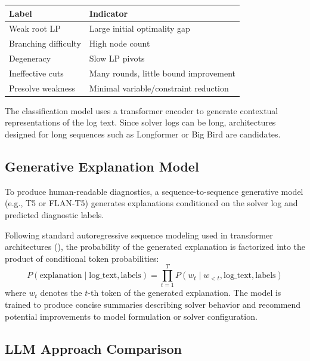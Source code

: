 \documentclass[11pt]{article}
\begin{document}
\begin{table}[h]
\centering
\begin{tabular}{ll}
\toprule
\textbf{Label} & \textbf{Indicator} \\
\midrule
Weak root LP & Large initial optimality gap \\
Branching difficulty & High node count \\
Degeneracy & Slow LP pivots \\
Ineffective cuts & Many rounds, little bound improvement \\
Presolve weakness & Minimal variable/constraint reduction \\
\bottomrule
\end{tabular}
\label{tab:labels}
\end{table}

The classification model uses a transformer encoder to generate contextual representations of the log text. Since solver logs can be long, architectures designed for long sequences such 
as Longformer \cite{beltagy2020longformer} or Big Bird \cite{zaheer2020bigbird} are candidates.

\subsection{Generative Explanation Model}

To produce human-readable diagnostics, a sequence-to-sequence generative model (e.g., T5 or FLAN-T5) generates explanations conditioned on the solver log and predicted diagnostic labels. 

Following standard autoregressive sequence modeling used in transformer architectures (\cite{raffel2020t5}), the probability of the generated explanation is factorized into the product of conditional token probabilities:
\begin{equation}
    P(\text{explanation} \mid \text{log\_text}, \text{labels}) = \prod_{t=1}^{T} P(w_t \mid w_{<t}, \text{log\_text}, \text{labels})
\end{equation}
where $w_t$ denotes the $t$-th token of the generated explanation. The model is trained to produce concise summaries describing solver behavior and recommend potential improvements to model 
formulation or solver configuration.

\subsection{LLM Approach Comparison}
\end{document}
